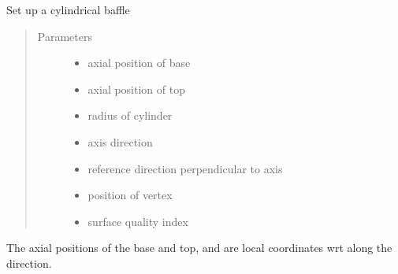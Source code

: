\documentclass[letterpaper,10pt,english]{sphinxmanual}
\begin{document}

\begin{fulllineitems}
\label{\detokenize{xsrt_functions:xsrt.baffle}}
Set up a cylindrical baffle
\begin{quote}\begin{description}
\item[{Parameters}] \leavevmode\begin{itemize}
\item {} 
 \textendash{} axial position of base

\item {} 
 \textendash{} axial position of top

\item {} 
 \textendash{} radius of cylinder

\item {} 
 \textendash{} axis direction

\item {} 
 \textendash{} reference direction perpendicular to axis

\item {} 
 \textendash{} position of vertex

\item {} 
 \textendash{} surface quality index

\end{itemize}

\end{description}\end{quote}

The axial positions of the base and top,  and 
are local coordinates wrt  along the  direction.

\end{fulllineitems}

\end{document}
